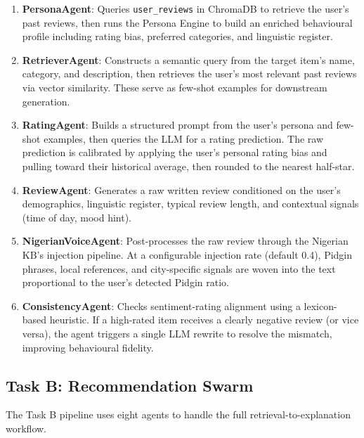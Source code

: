 \documentclass[11pt,a4paper]{article}
\begin{document}
\begin{enumerate}[leftmargin=*, label=\textbf{\arabic*.}]
    \item \textbf{PersonaAgent}: Queries \texttt{user\_reviews} in ChromaDB to retrieve the user's past reviews, then runs the Persona Engine to build an enriched behavioural profile including rating bias, preferred categories, and linguistic register.

    \item \textbf{RetrieverAgent}: Constructs a semantic query from the target item's name, category, and description, then retrieves the user's most relevant past reviews via vector similarity. These serve as few-shot examples for downstream generation.

    \item \textbf{RatingAgent}: Builds a structured prompt from the user's persona and few-shot examples, then queries the LLM for a rating prediction. The raw prediction is calibrated by applying the user's personal rating bias and pulling toward their historical average, then rounded to the nearest half-star.

    \item \textbf{ReviewAgent}: Generates a raw written review conditioned on the user's demographics, linguistic register, typical review length, and contextual signals (time of day, mood hint).

    \item \textbf{NigerianVoiceAgent}: Post-processes the raw review through the Nigerian KB's injection pipeline. At a configurable injection rate (default 0.4), Pidgin phrases, local references, and city-specific signals are woven into the text proportional to the user's detected Pidgin ratio.

    \item \textbf{ConsistencyAgent}: Checks sentiment-rating alignment using a lexicon-based heuristic. If a high-rated item receives a clearly negative review (or vice versa), the agent triggers a single LLM rewrite to resolve the mismatch, improving behavioural fidelity.
\end{enumerate}

\subsection{Task B: Recommendation Swarm}

The Task B pipeline uses eight agents to handle the full retrieval-to-explanation workflow.
\end{document}
